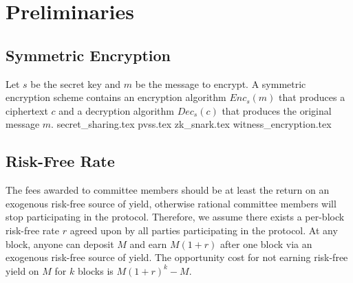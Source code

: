 \section{Preliminaries}
    \subsection{Symmetric Encryption}
    Let $s$ be the secret key and $m$ be the message to encrypt.
    A symmetric encryption scheme contains an encryption algorithm $Enc_s(m)$ that produces a ciphertext $c$ and a decryption algorithm $Dec_s(c)$ that produces the original message $m$.
    {secret_sharing.tex}
    {pvss.tex}
    {zk_snark.tex}
    {witness_encryption.tex}
    \subsection{Risk-Free Rate}\label{subsection:prelim-rfr}
    The fees awarded to committee members should be at least the return on an exogenous risk-free source of yield, otherwise rational committee members will stop participating in the protocol.
    Therefore, we assume there exists a per-block risk-free rate $r$ agreed upon by all parties participating in the protocol.
    At any block, anyone can deposit $M$ and earn $M(1 + r)$ after one block via an exogenous risk-free source of yield.
    The opportunity cost for not earning risk-free yield on $M$ for $k$ blocks is $M(1 + r)^k - M$.

